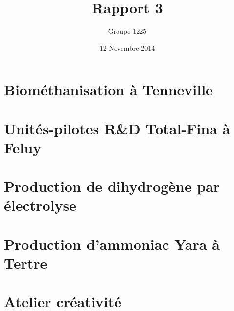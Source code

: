 \documentclass[a4paper, oneside, 12pt]{article}
\title{Rapport 3}
\author{Groupe 1225}
\date{12 Novembre 2014}
\begin{document}
\maketitle

\section{Biométhanisation à Tenneville}

\section{Unités-pilotes R\&D Total-Fina à Feluy}

\section{Production de dihydrogène par électrolyse}

\section{Production d'ammoniac Yara à Tertre}

\section{Atelier créativité}
\end{document}
